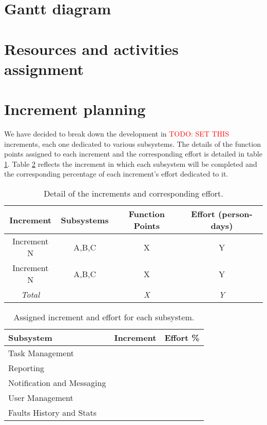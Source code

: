 

\section{Gantt diagram}

\section{Resources and activities assignment}

\section{Increment planning}

We have decided to break down the development in \textcolor{red}{TODO: SET THIS} increments, each one dedicated to various subsystems. The details of the function points assigned to each increment and the corresponding effort is detailed in table \ref{tblIncrementsSubsystems}. Table \ref{tblSubsystemsAssignedIncrement} reflects the increment in which each subsystem will be completed and the corresponding percentage of each increment's effort dedicated to it.

\begin{table}[hbtp]
\centering
\begin{tabular}{c|c|c|c}
\textbf{Increment} & \textbf{Subsystems} & \textbf{Function Points} & \textbf{Effort (person-days)} \\ \hline
Increment N & A,B,C & X & Y \\
Increment N & A,B,C & X & Y \\ \hline
\textit{Total} &  & \textit{X} & \textit{Y} \\
\end{tabular}
\caption{Detail of the increments and corresponding effort.}
\label{tblIncrementsSubsystems}
\end{table}

\begin{table}[hbtp]
\centering
\begin{tabular}{l|c|c}
\textbf{Subsystem} & \textbf{Increment} & \textbf{Effort \%}  \\ \hline
Task Management & & \\
Reporting & & \\
Notification and Messaging & & \\
User Management & & \\
Faults History and Stats & & \\
\end{tabular}
\caption{Assigned increment and effort for each subsystem.}
\label{tblSubsystemsAssignedIncrement}
\end{table}

